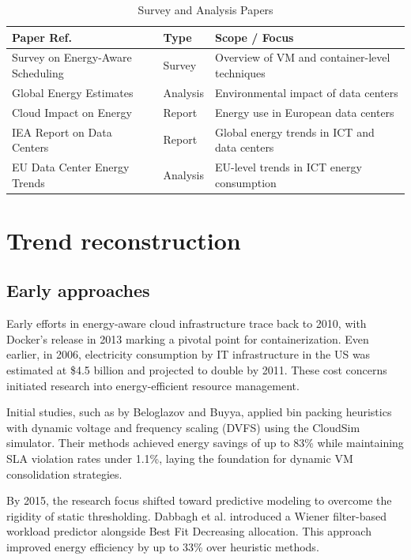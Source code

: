 \documentclass[runningheads]{llncs}
\begin{document}
\begin{table}[H]
\centering
\footnotesize
\begin{tabular}{|p{5.5cm}|p{3.5cm}|p{4cm}|}
\hline
\textbf{Paper Ref.} & \textbf{Type} & \textbf{Scope / Focus} \\
\hline
Survey on Energy-Aware Scheduling\cite{hameed_survey_2016}  & Survey & Overview of VM and container-level techniques \\
\hline
Global Energy Estimates\cite{masanet_2020} & Analysis & Environmental impact of data centers \\
\hline
Cloud Impact on Energy\cite{hintemann_2022} & Report & Energy use in European data centers \\
\hline
IEA Report on Data Centers\cite{IEADataCentres} & Report & Global energy trends in ICT and data centers \\
\hline
EU Data Center Energy Trends\cite{avgerinou_trends_2017} & Analysis & EU-level trends in ICT energy consumption \\
\hline
\end{tabular}
\caption{Survey and Analysis Papers}
\label{tab:surveys}
\end{table}

\section{Trend reconstruction}

\subsection{Early approaches}

Early efforts in energy-aware cloud infrastructure trace back to 2010, with Docker’s release in 2013 marking a pivotal point for containerization. Even earlier, in 2006, electricity consumption by IT infrastructure in the US was estimated at \$4.5 billion and projected to double by 2011\cite{beloglazov_energy_2010}. These cost concerns initiated research into energy-efficient resource management.

Initial studies, such as by Beloglazov and Buyya\cite{beloglazov_energy_2010}, applied bin packing heuristics with dynamic voltage and frequency scaling (DVFS) using the CloudSim simulator. Their methods achieved energy savings of up to 83\% while maintaining SLA violation rates under 1.1\%, laying the foundation for dynamic VM consolidation strategies.

By 2015, the research focus shifted toward predictive modeling to overcome the rigidity of static thresholding. Dabbagh et al.\cite{dabbagh_energy-efficient_2015} introduced a Wiener filter-based workload predictor alongside Best Fit Decreasing allocation. This approach improved energy efficiency by up to 33\% over heuristic methods.
\end{document}
